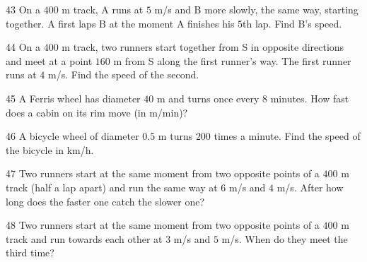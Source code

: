 \gap
\begin{probbox}{43}{}
On a $400$ m track, A runs at $5$ m/s and B more slowly, the same way, starting together. A first laps B at the moment A finishes his $5$th lap. Find B's speed.
\end{probbox}
\gap
\begin{probbox}{44}{}
On a $400$ m track, two runners start together from S in opposite directions and meet at a point $160$ m from S along the first runner's way. The first runner runs at $4$ m/s. Find the speed of the second.
\end{probbox}
\gap
\begin{probbox}{45}{}
A Ferris wheel has diameter $40$ m and turns once every $8$ minutes. How fast does a cabin on its rim move (in m/min)?
\end{probbox}
\gap
\begin{probbox}{46}{}
A bicycle wheel of diameter $0.5$ m turns $200$ times a minute. Find the speed of the bicycle in km/h.
\end{probbox}
\gap
\begin{probbox}{47}{}
Two runners start at the same moment from two opposite points of a $400$ m track (half a lap apart) and run the same way at $6$ m/s and $4$ m/s. After how long does the faster one catch the slower one?
\end{probbox}
\gap
\begin{probbox}{48}{}
Two runners start at the same moment from two opposite points of a $400$ m track and run towards each other at $3$ m/s and $5$ m/s. When do they meet the third time?
\end{probbox}

